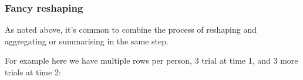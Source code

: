 \documentclass[]{article}
\newenvironment{Shaded}{\begin{snugshade}}{\end{snugshade}}
\newcommand{\KeywordTok}[1]{\textcolor[rgb]{0.13,0.29,0.53}{\textbf{#1}}}
\newcommand{\NormalTok}[1]{#1}
\newcommand{\OperatorTok}[1]{\textcolor[rgb]{0.81,0.36,0.00}{\textbf{#1}}}
\newcommand{\StringTok}[1]{\textcolor[rgb]{0.31,0.60,0.02}{#1}}
\begin{document}
\hypertarget{fancy-reshaping}{%
\subsubsection*{Fancy reshaping}\label{fancy-reshaping}}

As noted above, it's common to combine the process of reshaping and aggregating
or summarising in the same step.

For example here we have multiple rows per person, 3 trial at time 1, and 3 more
trials at time 2:

\begin{Shaded}
\end{Shaded}
\end{document}
